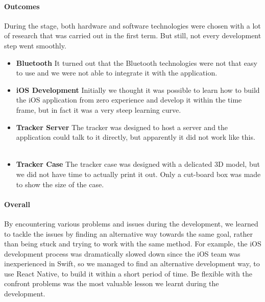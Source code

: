 \documentclass[12pt,a4paper]{article}
\begin{document}
        \paragraph{Outcomes} During the stage, both hardware and software technologies were chosen with a lot of research that was carried out in the first term. But still, not every development step went smoothly. 
        \begin{itemize}
          \item {\bf Bluetooth} It turned out that the Bluetooth technologies were not that easy to use and we were not able to integrate it with the application. 
          \item {\bf iOS Development} Initially we thought it was possible to learn how to build the iOS application from zero experience and develop it within the time frame, but in fact it was a very steep learning curve.
          \item {\bf Tracker Server} The tracker was designed to host a server and the application could talk to it directly, but apparently it did not work like this.
          \item {\bf Tracker Case} The tracker case was designed with a delicated 3D model, but we did not have time to actually print it out. Only a cut-board box was made to show the size of the case.
        \end{itemize}

        \paragraph{Overall} By encountering various problems and issues during the development, we learned to tackle the issues by finding an alternative way towards the same goal, rather than being stuck and trying to work with the same method. For example, the iOS development process was dramatically slowed down since the iOS team was inexperienced in Swift, so we managed to find an alternative development way, to use React Native, to build it within a short period of time. Be flexible with the confront problems was the most valuable lesson we learnt during the development. 
        
\end{document}
